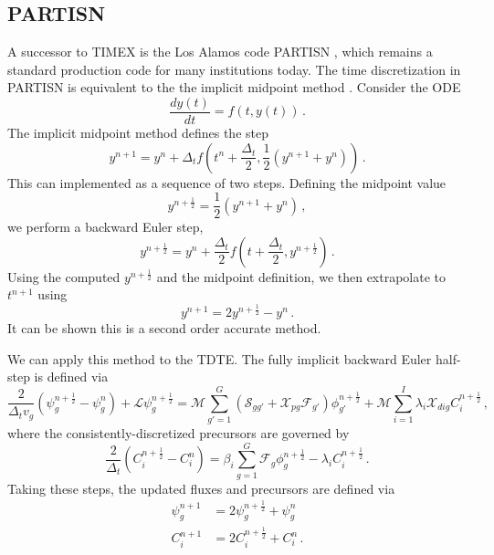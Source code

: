 \subsection{PARTISN}

A successor to TIMEX is the Los Alamos code 
PARTISN \cite{alcouffe2005par},
which remains a standard production code for many
institutions today.
The time discretization in PARTISN  is equivalent 
to the the implicit midpoint method \cite{alcouffe1998par}.  Consider the ODE
\begin{equation}
 \frac{d y(t)}{dt} = f(t, y(t)) \, .
\end{equation}
The implicit midpoint method defines the step
\begin{equation}
 y^{n+1} = y^n + \Delta_t f \left (t^n + \frac{\Delta_t}{2},
                                   \frac{1}{2} \left (y^{n+1} + y^{n} \right)  \right ) \, .
\end{equation}
This can implemented as a sequence of two steps.  Defining
the midpoint value
\begin{equation}
 y^{n+\frac{1}{2}} =  \frac{1}{2} \left (y^{n+1} + y^{n} \right) \, ,
\end{equation}
we perform a backward Euler step,
\begin{equation}
 y^{n+\frac{1}{2}} = y^n + \frac{\Delta_t}{2} 
    f \left (t+\frac{\Delta_t}{2}, y^{n+\frac{1}{2}} \right ) \, .
\end{equation}
Using the computed $y^{n+\frac{1}{2}}$ and the midpoint definition, we 
then extrapolate to $t^{n+1}$ 
using
\begin{equation}
 y^{n+1} =  2y^{n+\frac{1}{2}} - y^n \, .
\end{equation}
It can be shown this is a second order accurate method.  

We can apply this method to the TDTE.  The fully implicit
backward Euler half-step is defined via
\begin{equation}
  \frac{2}{\Delta_t v_g} \left ( \psi^{n+\frac{1}{2}}_g - \psi^{n}_g \right )
     + \mathcal{L}\psi^{n+\frac{1}{2}}_g = 
       \mathcal{M} \sum_{g'=1}^G 
         \left (
           \mathcal{S}_{gg'} + 
           \mathcal{X}_{pg} \mathcal{F}_{g'} 
         \right )\phi^{n+\frac{1}{2}}_{g'}
     +  \mathcal{M}\sum_{i=1}^{I} \lambda_i \mathcal{X}_{dig} C^{n+\frac{1}{2}}_i \, ,
\label{eq:partisnpsi}
\end{equation}
where the consistently-discretized precursors are
governed by
\begin{equation}
 \frac{2}{\Delta_t} \left ( C_i^{n+\frac{1}{2}} - C_i^{n} \right )
   = \beta_i \sum_{g=1}^G \mathcal{F}_{g} \phi^{n+\frac{1}{2}}_{g} - \lambda_i C^{n+\frac{1}{2}}_i \, .
\label{eq:partisnC}
\end{equation}
Taking these steps, the updated fluxes and precursors are
defined via
\begin{equation}
 \begin{split}
   \psi_g^{n+1} &= 2 \psi_g^{n+\frac{1}{2}} + \psi_g^{n} \\
   C_i^{n+1}    &= 2 C_i^{n+\frac{1}{2}} + C_i^{n} \, .
 \end{split}
\end{equation}

